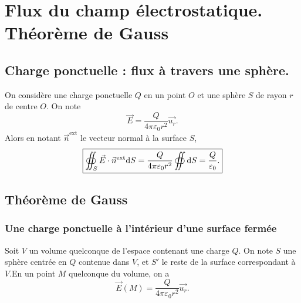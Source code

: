 \section{Flux du champ électrostatique. Théorème de Gauss}

    \subsection{Charge ponctuelle : flux à travers une sphère.}

        On considère une charge ponctuelle $Q$ en un point $O$ et une sphère $S$ de rayon $r$ de centre $O$. On note
        \begin{equation}
            \vec{E}=\frac{Q}{4\pi\varepsilon_{0}r^{2}}\vec{u_r}.
        \end{equation}
        Alors en notant $\vec{n}^{\text{ext}}$ le vecteur normal à la surface $S$,
        \begin{equation}
            \boxed{
                \oiint_{S}\vec{E}\cdot\vec{n}^{\text{ext}}\mathrm{d} S=\frac{Q}{4\pi\varepsilon_{0}r^{2}}\oiint\mathrm{d} S=\frac{Q}{\varepsilon_{0}}.
            }
        \end{equation}

    \subsection{Théorème de Gauss}
        \subsubsection{Une charge ponctuelle à l'intérieur d'une surface fermée}

            Soit $V$ un volume quelconque de l'espace contenant une charge $Q$. On note $S$ une sphère centrée en $Q$ contenue dans $V$, et $S'$ le reste de la surface correspondant à $V$.En un point $M$ quelconque du volume, on a
            \begin{equation}
                \vec{E}(M)=\frac{Q}{4\pi\varepsilon_{0}r^{2}}\vec{u_r}.
            \end{equation}


